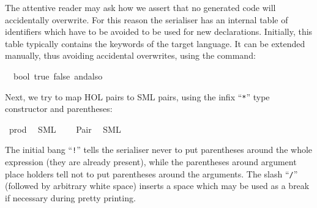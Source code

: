 \begin{isabellebody}
\begin{isamarkuptext}
\begin{typewriter}
  \end{typewriter}%
\end{isamarkuptext}%
\isamarkuptrue%
%
\endisatagquote
{\isafoldquote}%
%
\isadelimquote
%
\endisadelimquote
%
\begin{isamarkuptext}%
\noindent The attentive reader may ask how we assert that no
  generated code will accidentally overwrite.  For this reason the
  serialiser has an internal table of identifiers which have to be
  avoided to be used for new declarations.  Initially, this table
  typically contains the keywords of the target language.  It can be
  extended manually, thus avoiding accidental overwrites, using the
  \hypertarget{command.code-reserved}{\hyperlink{command.code-reserved}{\mbox{}}} command:%
\end{isamarkuptext}%
\isamarkuptrue%
%
\isadelimquote
%
\endisadelimquote
%
\isatagquote
{}\isamarkupfalse%
\ {\isachardoublequoteopen}{\isasymSML}{\isachardoublequoteclose}\ bool\ true\ false\ andalso%
\endisatagquote
{\isafoldquote}%
%
\isadelimquote
%
\endisadelimquote
%
\begin{isamarkuptext}%
\noindent Next, we try to map HOL pairs to SML pairs, using the
  infix ``\verb|*|'' type constructor and parentheses:%
\end{isamarkuptext}%
\isamarkuptrue%
%
\isadeliminvisible
%
\endisadeliminvisible
%
\isataginvisible
%
\endisataginvisible
{\isafoldinvisible}%
%
\isadeliminvisible
%
\endisadeliminvisible
%
\isadelimquotett
%
\endisadelimquotett
%
\isatagquotett
{}\isamarkupfalse%
\ prod\isanewline
\ \ {\isacharparenleft}SML\ \ {}\ {\isachardoublequoteopen}{\isacharasterisk}{\isachardoublequoteclose}{\isacharparenright}\isanewline
{}\isamarkupfalse%
\ Pair\isanewline
\ \ {\isacharparenleft}SML\ {\isachardoublequoteopen}{\isacharbang}{\isacharparenleft}{\isacharparenleft}{\isacharunderscore}{\isacharparenright}{\isacharcomma}{\isacharslash}\ {\isacharparenleft}{\isacharunderscore}{\isacharparenright}{\isacharparenright}{\isachardoublequoteclose}{\isacharparenright}%
\endisatagquotett
{\isafoldquotett}%
%
\isadelimquotett
%
\endisadelimquotett
%
\begin{isamarkuptext}%
\noindent The initial bang ``\verb|!|'' tells the serialiser
  never to put parentheses around the whole expression (they are
  already present), while the parentheses around argument place
  holders tell not to put parentheses around the arguments.  The slash
  ``\verb|/|'' (followed by arbitrary white space) inserts a
  space which may be used as a break if necessary during pretty
  printing.


\end{isamarkuptext}
\end{isabellebody}
